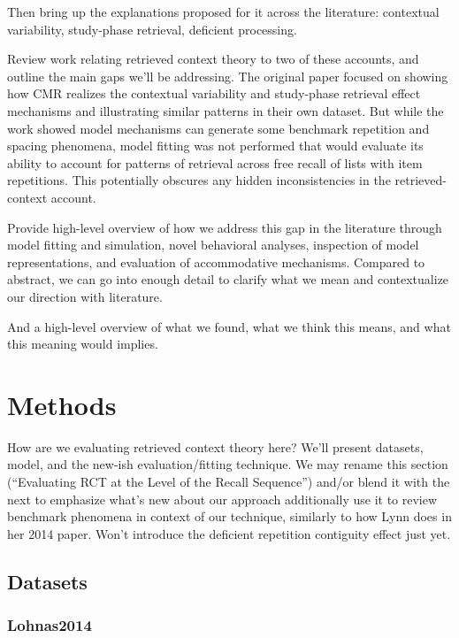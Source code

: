 \documentclass[
  letterpaper,
  DIV=11]{article}
\begin{document}
Then bring up the explanations proposed for it across the literature:
contextual variability, study-phase retrieval, deficient processing.

Review work relating retrieved context theory to two of these accounts,
and outline the main gaps we'll be addressing. The original paper
focused on showing how CMR realizes the contextual variability and
study-phase retrieval effect mechanisms and illustrating similar
patterns in their own dataset. But while the work showed model
mechanisms can generate some benchmark repetition and spacing phenomena,
model fitting was not performed that would evaluate its ability to
account for patterns of retrieval across free recall of lists with item
repetitions. This potentially obscures any hidden inconsistencies in the
retrieved-context account.

Provide high-level overview of how we address this gap in the literature
through model fitting and simulation, novel behavioral analyses,
inspection of model representations, and evaluation of accommodative
mechanisms. Compared to abstract, we can go into enough detail to
clarify what we mean and contextualize our direction with literature.

And a high-level overview of what we found, what we think this means,
and what this meaning would implies.

\hypertarget{methods}{%
\section{Methods}\label{methods}}

How are we evaluating retrieved context theory here? We'll present
datasets, model, and the new-ish evaluation/fitting technique. We may
rename this section (``Evaluating RCT at the Level of the Recall
Sequence'') and/or blend it with the next to emphasize what's new about
our approach additionally use it to review benchmark phenomena in
context of our technique, similarly to how Lynn does in her 2014 paper.
Won't introduce the deficient repetition contiguity effect just yet.

\hypertarget{datasets}{%
\subsection{Datasets}\label{datasets}}

\hypertarget{lohnas2014}{%
\subsubsection{Lohnas2014}\label{lohnas2014}}
\end{document}
